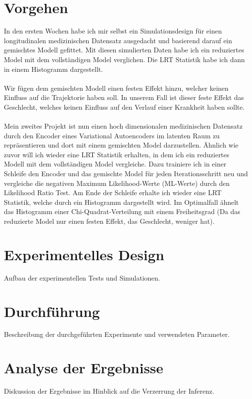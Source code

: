 \documentclass[%
thesis=student,%
coverpage=false,%
titlepage=false,%
headmarks=true, %
german,%
font=libertine, %
math=newpxtx, %
BCOR=5mm,%
coverBCOR=11mm%
]{tumbook}
\theoremstyle{break}
\begin{document}
\section{Vorgehen}
In den ersten Wochen habe ich mir selbst ein Simulationsdesign für einen longitudinalen medizinischen Datensatz ausgedacht und basierend darauf ein gemischtes Modell gefittet. Mit diesen simulierten Daten habe ich ein reduziertes Model mit dem vollständigen Model verglichen. Die LRT Statistik habe ich dann in einem Histogramm dargestellt.\\
\\
Wir fügen dem gemischten Modell einen festen Effekt hinzu, welcher keinen Einfluss auf die Trajektorie haben soll. In unserem Fall ist dieser feste Effekt das Geschlecht, welches keinen Einfluss auf den Verlauf einer Krankheit haben sollte.\\
\\
Mein zweites Projekt ist nun einen hoch dimensionalen medizinischen Datensatz durch den Encoder eines Variational Autoencoders im latenten Raum zu repräsentieren und dort mit einem gemischten Model darzustellen. Ähnlich wie zuvor will ich wieder eine LRT Statistik erhalten, in dem ich ein reduziertes Modell mit dem vollständigen Model vergleiche. Dazu trainiere ich in einer Schleife den Encoder und das gemischte Model für jeden Iterationsschritt neu und vergleiche die negativen Maximum Likelihood-Werte (ML-Werte) durch den Likelihood Ratio Test. Am Ende der Schleife erhalte ich wieder eine LRT Statistik, welche durch ein Histogramm dargestellt wird. Im Optimalfall ähnelt das Histogramm einer Chi-Quadrat-Verteilung mit einem Freiheitsgrad (Da das reduzierte Model nur einen festen Effekt, das Geschlecht, weniger hat).\\
\section{Experimentelles Design}
Aufbau der experimentellen Tests und Simulationen.
\section{Durchführung}
Beschreibung der durchgeführten Experimente und verwendeten Parameter.
\section{Analyse der Ergebnisse}
Diskussion der Ergebnisse im Hinblick auf die Verzerrung der Inferenz.
\end{document}
